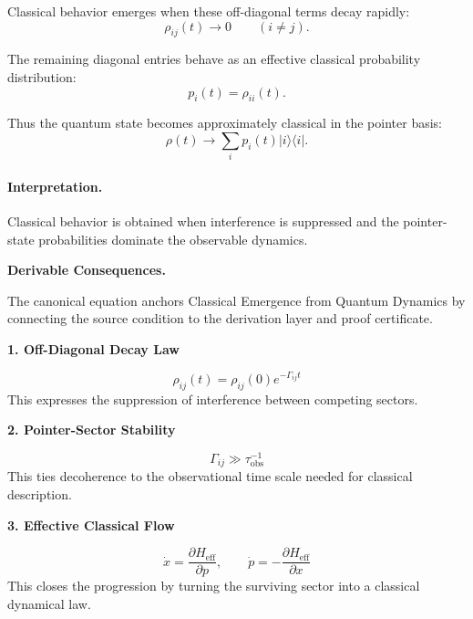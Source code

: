 Classical behavior emerges when these off-diagonal terms decay rapidly:
\begin{equation}
\rho_{ij}(t)\rightarrow 0
\qquad
(i\neq j).
\end{equation}

The remaining diagonal entries behave as an effective classical probability distribution:
\begin{equation}
p_i(t)=\rho_{ii}(t).
\end{equation}

Thus the quantum state becomes approximately classical in the pointer basis:
\begin{equation}
\boxed{
\rho(t)
\longrightarrow
\sum_i p_i(t)|i\rangle\langle i|.
}
\end{equation}

\paragraph{Interpretation.}
Classical behavior is obtained when interference is suppressed and the pointer-state probabilities dominate the observable dynamics.

\par\vspace{0.35em}
\noindent\textbf{Derivable Consequences.}\quad
\begingroup
\footnotesize
\raggedright
The canonical equation anchors Classical Emergence from Quantum Dynamics by connecting the source condition to the derivation layer and proof certificate.
\par\endgroup

\noindent\textbf{1. Off-Diagonal Decay Law}\par
\[
\rho_{ij}(t)=\rho_{ij}(0)e^{-\Gamma_{ij} t}
\]
\noindent This expresses the suppression of interference between competing sectors.\par
\noindent\textbf{2. Pointer-Sector Stability}\par
\[
\Gamma_{ij} \gg \tau_{\mathrm{obs}}^{-1}
\]
\noindent This ties decoherence to the observational time scale needed for classical description.\par
\noindent\textbf{3. Effective Classical Flow}\par
\[
\dot{x}=\frac{\partial H_{\mathrm{eff}}}{\partial p},
\qquad
\dot{p}=-\frac{\partial H_{\mathrm{eff}}}{\partial x}
\]
\noindent This closes the progression by turning the surviving sector into a classical dynamical law.\par

